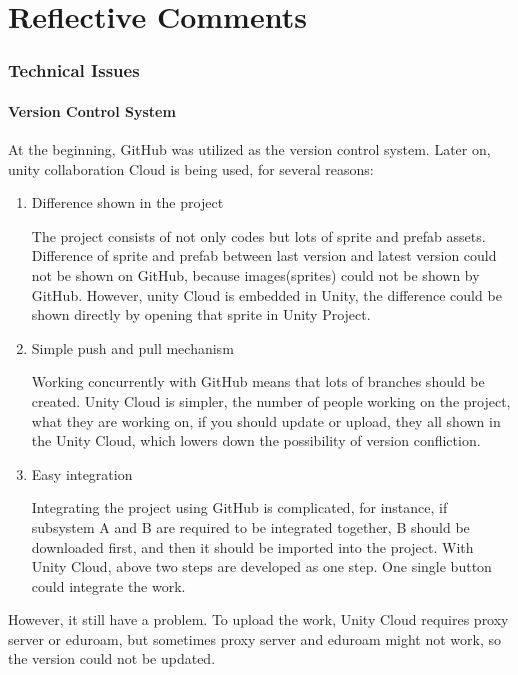 \documentclass[12pt, a4paper]{report}
\author{Minghao Wang 16522066}
\begin{document}
\part{Reflective Comments}
	\section{Technical Issues}
		\subsection{Version Control System}
		At the beginning, GitHub was utilized as the version control system. Later on, unity collaboration Cloud is being used, for several reasons:\\
		\begin{enumerate}
			\item Difference shown in the project

			The project consists of not only codes but lots of sprite and prefab assets. Difference of sprite and prefab between last version and latest version could not be shown on GitHub,  because images(sprites) could not be shown by GitHub. However, unity Cloud is embedded in Unity, the difference could be shown directly by opening that sprite in Unity Project.\\


			\item Simple push and pull mechanism

			Working concurrently with GitHub means that lots of branches should be created. Unity Cloud is simpler, the number of people working on the project, what they are working on, if you should update or upload, they all shown in the Unity Cloud, which lowers down the possibility of version confliction.\\

			\item Easy integration 

			Integrating the project using GitHub is complicated, for instance, if subsystem A and B are required to be integrated together, B should be downloaded first, and then it should be imported into the project. With Unity Cloud, above two steps are developed as one step. One single button could integrate the work. \\
		\end{enumerate}
		However, it still have a problem. To upload the work, Unity Cloud requires proxy server or eduroam, but sometimes proxy server and eduroam might not work, so the version could not be updated.
\end{document}
